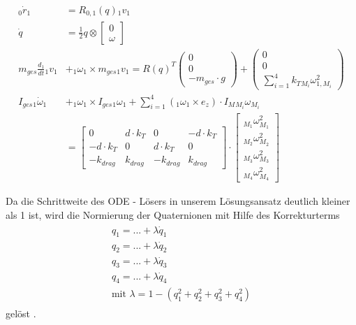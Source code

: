 \begin{align}
    {_{0}\dot{r}_{1}} &= R_{0, 1}(q) {_{1}v_{1}} \\
    \dot q &= \frac{1}{2} q \otimes \begin{bmatrix} 0 \\ \omega \end{bmatrix} \\
    m_{ges} \frac{d_1}{dt} {_{1}v_{1}} &+ {_{1}\omega_{1}} \times m_{ges} {_{1}v_{1}} = R(q)^T \begin{pmatrix} 0 \\ 0 \\ -m_{ges} \cdot g \end{pmatrix} + {\begin{pmatrix} 0 \\ 0 \\ \sum_{i = 1}^4 k_{T} {_{M_i}\omega^2_{1, M_i}} \end{pmatrix}} \\
    I_{ges} {_{1} \dot{\omega}_{1}} &+ {_{1} {\omega}_{1}} \times I_{ges} {_{1} {\omega}_{1}} + \sum_{i=1}^{4}{({_{1}{\omega}_{1}} \times e_z) \cdot I_{M} {_{M_i}\omega_{M_i}} } \\
    &= \begin{bmatrix} 0              & d \cdot k_{T} & 0             & -d \cdot k_{T} \\ 
                       -d \cdot k_{T} & 0             & d \cdot k_{T} & 0  \\
                       -k_{drag}      & k_{drag}      & -k_{drag}    & k_{drag}
       \end{bmatrix}
    \cdot 
    \begin{bmatrix}
      {_{M_1} {\omega}^2_{M_1}} \\
      {_{M_2} {\omega}^2_{M_2}}\\
      {_{M_3} {\omega}^2_{M_3}}\\
      {_{M_4} {\omega}^2_{M_4}}
    \end{bmatrix}
\end{align}

Da die Schrittweite des ODE - Lösers in unserem Lösungsansatz deutlich kleiner als 1 ist, wird die Normierung der Quaternionen mit Hilfe des Korrekturterms 
\begin{align}
  \begin{matrix}
    q_1 = ... + \lambda \dot q_1\\
    q_2 = ... + \lambda \dot q_2\\
    q_3 = ... + \lambda \dot q_3\\
    q_4 = ... + \lambda \dot q_4\\
    \text{mit } \lambda = 1- (q_1^2 + q_2^2 + q_3^2 +q_4^2)
  \end{matrix}
\end{align} gelöst \cite{Cooke1992}.

